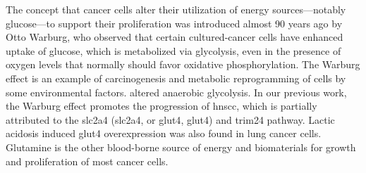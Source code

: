 \documentclass[12pt, a4paper]{article}
\begin{document}
\begin{outline}
\1 
\end{outline}

The concept that cancer cells alter their utilization of energy sources—notably glucose—to support their proliferation was introduced almost 90 years ago by Otto Warburg, who observed that certain cultured-cancer cells have enhanced uptake of glucose, which is metabolized via glycolysis, even in the presence of oxygen levels that normally should favor oxidative phosphorylation.
The Warburg effect\citep{Warburg1956} is an example of carcinogenesis and metabolic reprogramming of cells by some environmental factors.
altered anaerobic glycolysis. 
In our previous work\citep{Chang2017b}, the Warburg effect promotes the progression of \acrshort{hnscc}, which is partially attributed to the \acrlong{slc2a4} (\acrshort{slc2a4}, or \acrlong{glut4}, \acrshort{glut4}) and \acrfull{trim24} pathway\cite{Chang2017b}\cite{Mani2020}.
Lactic acidosis induced \acrshort{glut4} overexpression was also found in lung cancer cells\cite{Prado-Garcia2020}. 
Glutamine is the other blood-borne source of energy and biomaterials for growth and proliferation of most cancer cells\citep{Hanahan2017}.





\end{document}
